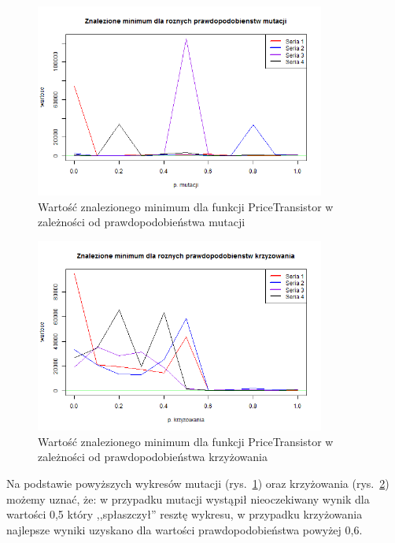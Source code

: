 \documentclass[11pt, a4paper]{article}
\newcommand{\fbi}{\leavevmode{\parindent=1em\indent}}
\begin{document}
\begin{figure}[H]
	\begin{center}
		\includegraphics[width=0.85\textwidth]{./assets/PriceTransistor2.png}
		\caption{Wartość znalezionego minimum dla funkcji PriceTransistor w zależności od prawdopodobieństwa mutacji}
		\label{fig:pricetransistor2}
	\end{center}
\end{figure}

\begin{figure}[H]
	\begin{center}
		\includegraphics[width=0.85\textwidth]{./assets/PriceTransistor3.png}
		\caption{Wartość znalezionego minimum dla funkcji PriceTransistor w zależności od prawdopodobieństwa krzyżowania}
		\label{fig:pricetransistor3}
	\end{center}
\end{figure}

\fbi
Na podstawie powyższych wykresów mutacji (rys.~\ref{fig:pricetransistor2}) oraz krzyżowania (rys.~\ref{fig:pricetransistor3}) możemy uznać, że: w przypadku mutacji wystąpił nieoczekiwany wynik dla wartości 0,5 który ,,spłaszczył'' resztę wykresu, w przypadku krzyżowania najlepsze wyniki uzyskano dla wartości prawdopodobieństwa powyżej 0,6.
\end{document}
